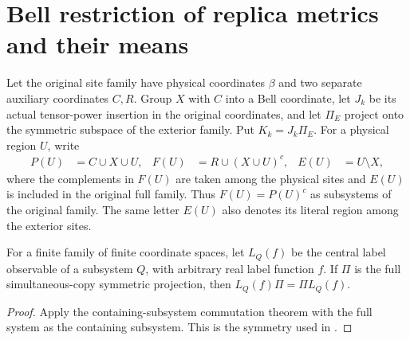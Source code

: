 \section{Bell restriction of replica metrics and their means}

Let the original site family have physical coordinates $\beta$ and two
separate auxiliary coordinates $C,R$. Group $X$ with $C$ into a Bell
coordinate, let $J_k$ be its actual tensor-power insertion in the original
coordinates, and let $\Pi_E$ project onto the symmetric subspace of the
exterior family. Put $K_k=J_k\Pi_E$. For a physical region $U$, write
\begin{align*}
    P(U)&=C\cup X\cup U, &
    F(U)&=R\cup(X\cup U)^c, &
    E(U)&=U\setminus X,
\end{align*}
where the complements in $F(U)$ are taken among the physical sites and
$E(U)$ is included in the original full family. Thus $F(U)=P(U)^c$ as
subsystems of the original family. The same letter $E(U)$ also denotes
its literal region among the exterior sites.

\begin{theorem}
    \label{thm:central_label_full_symmetry}
    \leanok
    For a finite family of finite coordinate spaces, let $L_Q(f)$ be
    the central label observable of a subsystem $Q$, with arbitrary
    real label function $f$. If $\Pi$ is the full simultaneous-copy
    symmetric projection, then $L_Q(f)\Pi=\Pi L_Q(f)$.
\end{theorem}
\begin{proof}\leanok
    Apply the containing-subsystem commutation theorem with the full
    system as the containing subsystem. This is the symmetry
    used in \cite[\texttt{05-replicas.tex}, lines 101--102;
    \texttt{07-comparators.tex}, lines 299--308]{OpenAI2026AreaLaw}.
\end{proof}

